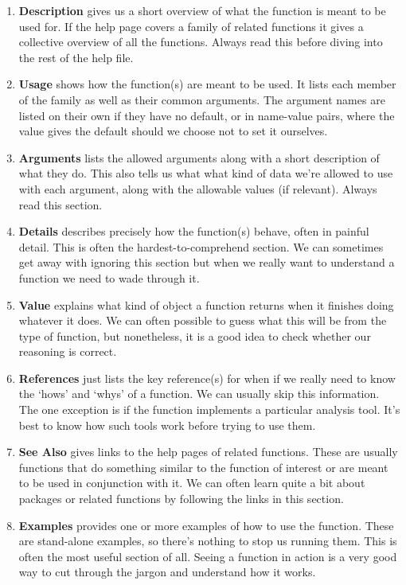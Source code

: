 \documentclass[
]{book}
\begin{document}
\begin{enumerate}
\def\labelenumi{\arabic{enumi}.}
\item
  \textbf{Description} gives us a short overview of what the function is meant to be used for. If the help page covers a family of related functions it gives a collective overview of all the functions. Always read this before diving into the rest of the help file.
\item
  \textbf{Usage} shows how the function(s) are meant to be used. It lists each member of the family as well as their common arguments. The argument names are listed on their own if they have no default, or in name-value pairs, where the value gives the default should we choose not to set it ourselves.
\item
  \textbf{Arguments} lists the allowed arguments along with a short description of what they do. This also tells us what what kind of data we're allowed to use with each argument, along with the allowable values (if relevant). Always read this section.
\item
  \textbf{Details} describes precisely how the function(s) behave, often in painful detail. This is often the hardest-to-comprehend section. We can sometimes get away with ignoring this section but when we really want to understand a function we need to wade through it.
\item
  \textbf{Value} explains what kind of object a function returns when it finishes doing whatever it does. We can often possible to guess what this will be from the type of function, but nonetheless, it is a good idea to check whether our reasoning is correct.
\item
  \textbf{References} just lists the key reference(s) for when if we really need to know the `hows' and `whys' of a function. We can usually skip this information. The one exception is if the function implements a particular analysis tool. It's best to know how such tools work before trying to use them.
\item
  \textbf{See Also} gives links to the help pages of related functions. These are usually functions that do something similar to the function of interest or are meant to be used in conjunction with it. We can often learn quite a bit about packages or related functions by following the links in this section.
\item
  \textbf{Examples} provides one or more examples of how to use the function. These are stand-alone examples, so there's nothing to stop us running them. This is often the most useful section of all. Seeing a function in action is a very good way to cut through the jargon and understand how it works.
\end{enumerate}
\end{document}

